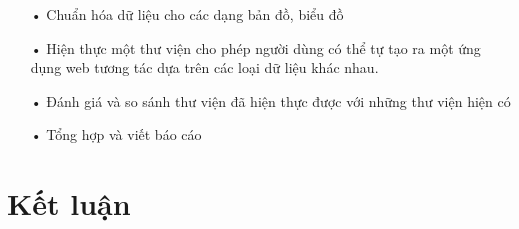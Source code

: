 \documentclass[12pt,a4paper,oneside]{article}
\begin{document}
\begin{itemize}
\item[•]Chuẩn hóa dữ liệu cho các dạng bản đồ, biểu đồ

\item[•]Hiện thực một thư viện cho phép người dùng có thể tự tạo ra một ứng dụng web tương tác dựa trên các loại dữ liệu khác nhau.

\item[•]Đánh giá và so sánh thư viện đã hiện thực được với những thư viện hiện có

\item[•]Tổng hợp và viết báo cáo

\end{itemize}


\section{Kết luận}
\end{document}
